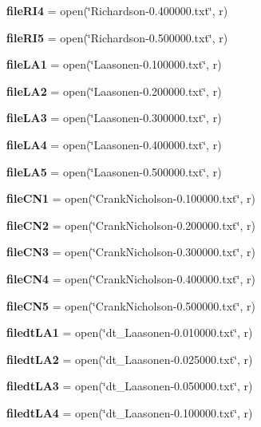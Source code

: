 \begin{DoxyCompactItemize}
\item 
\textbf{ file\+R\+I4} = open(\char`\"{}Richardson-\/0.\+400000.txt\char`\"{}, \textquotesingle{}r\textquotesingle{})
\item 
\textbf{ file\+R\+I5} = open(\char`\"{}Richardson-\/0.\+500000.txt\char`\"{}, \textquotesingle{}r\textquotesingle{})
\item 
\textbf{ file\+L\+A1} = open(\char`\"{}Laasonen-\/0.\+100000.txt\char`\"{}, \textquotesingle{}r\textquotesingle{})
\item 
\textbf{ file\+L\+A2} = open(\char`\"{}Laasonen-\/0.\+200000.txt\char`\"{}, \textquotesingle{}r\textquotesingle{})
\item 
\textbf{ file\+L\+A3} = open(\char`\"{}Laasonen-\/0.\+300000.txt\char`\"{}, \textquotesingle{}r\textquotesingle{})
\item 
\textbf{ file\+L\+A4} = open(\char`\"{}Laasonen-\/0.\+400000.txt\char`\"{}, \textquotesingle{}r\textquotesingle{})
\item 
\textbf{ file\+L\+A5} = open(\char`\"{}Laasonen-\/0.\+500000.txt\char`\"{}, \textquotesingle{}r\textquotesingle{})
\item 
\textbf{ file\+C\+N1} = open(\char`\"{}Crank\+Nicholson-\/0.\+100000.txt\char`\"{}, \textquotesingle{}r\textquotesingle{})
\item 
\textbf{ file\+C\+N2} = open(\char`\"{}Crank\+Nicholson-\/0.\+200000.txt\char`\"{}, \textquotesingle{}r\textquotesingle{})
\item 
\textbf{ file\+C\+N3} = open(\char`\"{}Crank\+Nicholson-\/0.\+300000.txt\char`\"{}, \textquotesingle{}r\textquotesingle{})
\item 
\textbf{ file\+C\+N4} = open(\char`\"{}Crank\+Nicholson-\/0.\+400000.txt\char`\"{}, \textquotesingle{}r\textquotesingle{})
\item 
\textbf{ file\+C\+N5} = open(\char`\"{}Crank\+Nicholson-\/0.\+500000.txt\char`\"{}, \textquotesingle{}r\textquotesingle{})
\item 
\textbf{ filedt\+L\+A1} = open(\char`\"{}dt\+\_\+\+Laasonen-\/0.\+010000.txt\char`\"{}, \textquotesingle{}r\textquotesingle{})
\item 
\textbf{ filedt\+L\+A2} = open(\char`\"{}dt\+\_\+\+Laasonen-\/0.\+025000.txt\char`\"{}, \textquotesingle{}r\textquotesingle{})
\item 
\textbf{ filedt\+L\+A3} = open(\char`\"{}dt\+\_\+\+Laasonen-\/0.\+050000.txt\char`\"{}, \textquotesingle{}r\textquotesingle{})
\item 
\textbf{ filedt\+L\+A4} = open(\char`\"{}dt\+\_\+\+Laasonen-\/0.\+100000.txt\char`\"{}, \textquotesingle{}r\textquotesingle{})

\end{DoxyCompactItemize}

